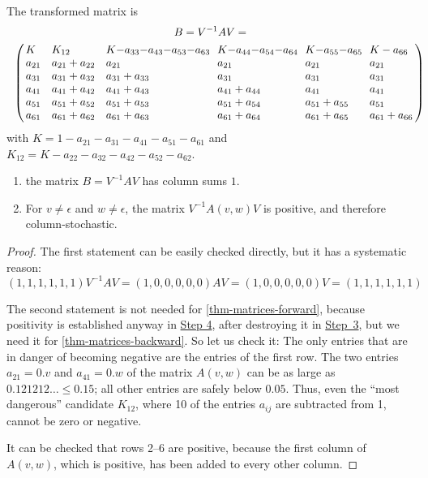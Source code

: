 \documentclass[a4paper,cleveref, autoref, thm-restate]{lipics-v2021}
\begin{document}
The transformed matrix is
\begin{multline*}
B =  V^{-1}AV= \\\ \ \left(\!\!
\begin{array}{l@{\ \ \ }l@{\ \ \ }l@{\ \ }l@{\ \ }l@{\ \ }l@{\,}}
  K &
 K_{12} %
  & K {-} a_{33} {-} a_{43} {-} a_{53} {-} a_{63}
  & K {-} a_{44} {-} a_{54} {-} a_{64}
  & K {-} a_{55} {-} a_{65}
  & K - a_{66} \\
a_{21} & a_{21} + a_{22} & a_{21} & a_{21} & a_{21} & a_{21} \\
a_{31} & a_{31} + a_{32} & a_{31} + a_{33} & a_{31} & a_{31} & a_{31} \\
a_{41} & a_{41} + a_{42} & a_{41} + a_{43} & a_{41} + a_{44} & a_{41} & a_{41} \\
a_{51} & a_{51} + a_{52} & a_{51} + a_{53} & a_{51} + a_{54} & a_{51} + a_{55} & a_{51} \\
a_{61} & a_{61} + a_{62} & a_{61} + a_{63} & a_{61} + a_{64} & a_{61} + a_{65} & a_{61} + a_{66}
\end{array}\right) \!\!\!\!\!\!
\end{multline*}
with
$K= 1-a_{21} - a_{31} - a_{41} - a_{51} - a_{61}$
and $K_{12} =  K {-} a_{22} {-} a_{32} {-} a_{42} {-} a_{52} {-} a_{62}$.

\begin{lemma}
  \label{lem:column-stochastic}
  \begin{enumerate}
  \item the matrix $B=V^{-1}AV$ has column sums
$1$.
\item For $v\ne\epsilon$ and
 $w\ne\epsilon$, the matrix $V^{-1}A(v,w)V$ is
 positive,
and therefore column-stochastic.
\end{enumerate}

\end{lemma}
\begin{proof}
  The first statement can be easily checked directly,
  but it has a systematic reason:
\begin{displaymath}
  (1,1,1,1,1,1)V^{-1}AV=
  (1,0,0,0,0,0)AV=
  (1,0,0,0,0,0)V=
  (1,1,1,1,1,1)
\end{displaymath}

The second statement is not needed for \autoref{thm-matrices-forward}, because positivity
is established anyway in \hyperref[sec:step4]{Step 4}, after destroying it in \hyperref[sec:step3]{Step~3}, but we
need it for \autoref{thm-matrices-backward}.
So let us check it: The only entries that are in danger of becoming negative
are the entries of the first row.
The two entries $a_{21}=0.v$ and  $a_{41}=0.w$ of the matrix $A(v,w)$ can be as large as
$0.121212\ldots \le 0.15$; all other entries are safely below $0.05$.
Thus, even the ``most dangerous'' candidate $K_{12}$, where 10 of the entries
$a_{ij}$ are subtracted from 1, cannot be zero or negative.

It can be checked that rows 2--6 are positive, because the
first column of $A(v,w)$, which is positive, has been added to every other column.
\end{proof}
\end{document}
